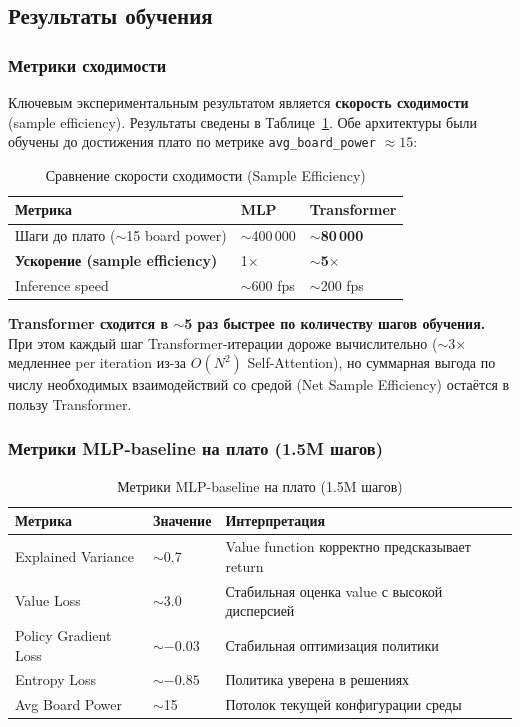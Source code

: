 \documentclass[a4paper,12pt]{extarticle}
\begin{document}
\subsection{Результаты обучения}

\subsubsection{Метрики сходимости}

Ключевым экспериментальным результатом является \textbf{скорость сходимости} (sample efficiency). Результаты сведены в Таблице~\ref{tab:sample_efficiency}. Обе архитектуры были обучены до достижения плато по метрике \texttt{avg\_board\_power} $\approx 15$:

\begin{longtable}{p{6cm}p{3.5cm}p{3.5cm}}
\caption{Сравнение скорости сходимости (Sample Efficiency)}\label{tab:sample_efficiency}\\
\toprule
\textbf{Метрика} & \textbf{MLP} & \textbf{Transformer} \\
\midrule
Шаги до плато ($\sim$15 board power) & $\sim$400\,000 & \textbf{$\sim$80\,000} \\
\textbf{Ускорение (sample efficiency)} & 1$\times$ & \textbf{$\sim$5$\times$} \\
Inference speed & $\sim$600 fps & $\sim$200 fps \\
\bottomrule
\end{longtable}

\textbf{Transformer сходится в $\sim$5 раз быстрее по количеству шагов обучения.} При этом каждый шаг Transformer-итерации дороже вычислительно ($\sim$3$\times$ медленнее per iteration из-за $O(N^2)$ Self-Attention), но суммарная выгода по числу необходимых взаимодействий со средой (Net Sample Efficiency) остаётся в пользу Transformer.

\subsubsection{Метрики MLP-baseline на плато (1.5M шагов)}

\begin{longtable}{p{5cm}p{3cm}p{5.5cm}}
\caption{Метрики MLP-baseline на плато (1.5M шагов)}\label{tab:mlp_metrics}\\
\toprule
\textbf{Метрика} & \textbf{Значение} & \textbf{Интерпретация} \\
\midrule
Explained Variance & $\sim$0.7 & Value function корректно предсказывает return \\
Value Loss & $\sim$3.0 & Стабильная оценка value с высокой дисперсией \\
Policy Gradient Loss & $\sim$$-0.03$ & Стабильная оптимизация политики \\
Entropy Loss & $\sim$$-0.85$ & Политика уверена в решениях \\
Avg Board Power & $\sim$15 & Потолок текущей конфигурации среды \\
\bottomrule
\end{longtable}
\end{document}

